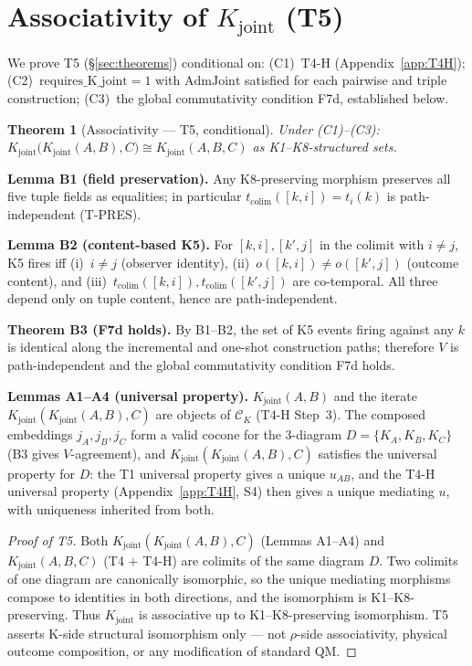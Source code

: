 \documentclass[12pt,a4paper]{article}
\theoremstyle{plain}
\newtheorem{theorem}{Theorem}[section]
\theoremstyle{definition}
\theoremstyle{remark}
\newcommand{\Kjoint}{K_{\mathrm{joint}}}
\begin{document}
\section{Associativity of $\Kjoint$ (T5)}
\label{app:T5}

We prove T5 (\S\ref{sec:theorems}) conditional on: \textup{(C1)}~T4-H
(Appendix~\ref{app:T4H}); \textup{(C2)}~$\mathrm{requires\_K\_joint} = 1$ with
$\mathrm{AdmJoint}$ satisfied for each pairwise and triple construction;
\textup{(C3)}~the global commutativity condition F7d, established below.

\begin{theorem}[Associativity --- T5, conditional]\label{thm:T5proof}
Under \textup{(C1)--(C3)}:
$\Kjoint\bigl(\Kjoint(A,B), C\bigr) \cong \Kjoint(A,B,C)$
as K1--K8-structured sets.
\end{theorem}

\noindent\textbf{Lemma B1 (field preservation).}
Any K8-preserving morphism preserves all five tuple fields as equalities; in
particular $t_{\mathrm{colim}}([k,i]) = t_i(k)$ is path-independent (T-PRES).

\noindent\textbf{Lemma B2 (content-based K5).}
For $[k,i], [k',j]$ in the colimit with $i \ne j$, K5 fires iff
\textup{(i)}~$i \ne j$ (observer identity),
\textup{(ii)}~$o([k,i]) \ne o([k',j])$ (outcome content), and
\textup{(iii)}~$t_{\mathrm{colim}}([k,i]), t_{\mathrm{colim}}([k',j])$ are
co-temporal. All three depend only on tuple content, hence are path-independent.

\noindent\textbf{Theorem B3 (F7d holds).}
By B1--B2, the set of K5 events firing against any $k$ is identical along the
incremental and one-shot construction paths; therefore $V$ is path-independent
and the global commutativity condition F7d holds.

\noindent\textbf{Lemmas A1--A4 (universal property).}
$\Kjoint(A,B)$ and the iterate $\Kjoint(\Kjoint(A,B),C)$ are objects of
$\mathcal{C}_K$ (T4-H Step~3). The composed embeddings $j_A, j_B, j_C$ form a
valid cocone for the 3-diagram $D = \{K_A, K_B, K_C\}$ (B3 gives $V$-agreement),
and $\Kjoint(\Kjoint(A,B),C)$ satisfies the universal property for $D$: the T1
universal property gives a unique $u_{AB}$, and the T4-H universal property
(Appendix~\ref{app:T4H}, S4) then gives a unique mediating $u$, with uniqueness
inherited from both.

\begin{proof}[Proof of T5]
Both $\Kjoint(\Kjoint(A,B),C)$ (Lemmas A1--A4) and $\Kjoint(A,B,C)$
(T4 $+$ T4-H) are colimits of the same diagram $D$. Two colimits of one diagram
are canonically isomorphic, so the unique mediating morphisms compose to
identities in both directions, and the isomorphism is K1--K8-preserving. Thus
$\Kjoint$ is associative up to K1--K8-preserving isomorphism. T5 asserts K-side
structural isomorphism only --- not $\rho$-side associativity, physical outcome
composition, or any modification of standard QM.
\end{proof}
\end{document}
